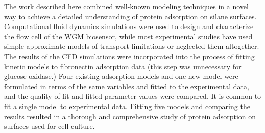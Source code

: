 The work described here combined well-known modeling techniques in
a novel way to achieve a detailed understanding of protein adsorption
on silane surfaces. Computational fluid dynamics simulations were
used to design and characterize the flow cell of the WGM biosensor,
while most experimental studies have used simple approximate models
of transport limitations or neglected them altogether. The results
of the CFD simulations were incorporated into the process of fitting
kinetic models to fibronectin adsorption data (this step was unnecessary
for glucose oxidase.) Four existing adsorption models and one new
model were formulated in terms of the same variables and fitted to
the experimental data, and the quality of fit and fitted parameter
values were compared. It is common to fit a single model to experimental
data. Fitting five models and comparing the results resulted in a
thorough and comprehensive study of protein adsorption on surfaces
used for cell culture.
